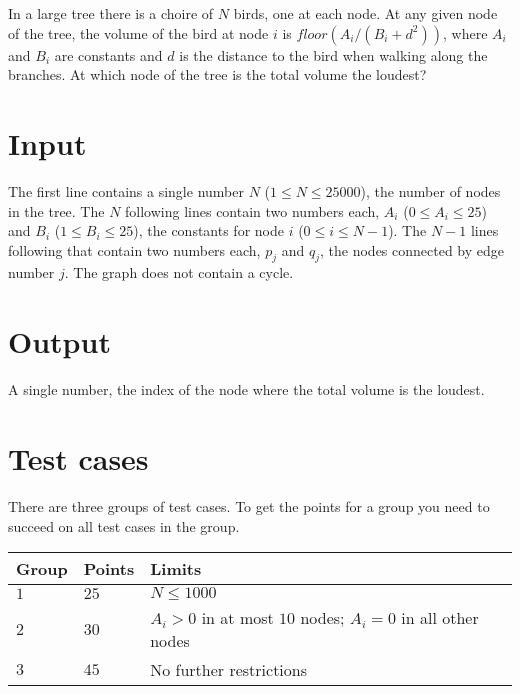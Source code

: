 In a large tree there is a choire of $N$ birds, one at each node. At any given node of the tree, the volume of the bird at node $i$ is $floor(A_i / (B_i + d^2))$, where $A_i$ and $B_i$ are constants and $d$ is the distance to the bird when walking along the branches. At which node of the tree is the total volume the loudest?

\section*{Input}
The first line contains a single number $N$ ($1 \le N \le 25000$), the number of nodes in the tree. The $N$ following lines contain two numbers each, $A_i$ ($0 \le A_i \le 25$) and $B_i$ ($1 \le B_i \le 25$), the constants for node $i$ ($0 \le i \le N-1$). The $N-1$ lines following that contain two numbers each, $p_j$ and $q_j$, the nodes connected by edge number $j$. The graph does not contain a cycle.

\section*{Output}
A single number, the index of the node where the total volume is the loudest.

\section*{Test cases}
There are three groups of test cases. To get the points for a group you need to succeed on all test cases in the group.

\noindent
\begin{tabular}{| l | l | l |}
  \hline
  Group & Points & Limits                                                      \\ \hline
  $1$   & $25$   & $N \le 1000$                                                \\ \hline
  $2$   & $30$   & $A_i > 0$ in at most $10$ nodes; $A_i=0$ in all other nodes \\ \hline
  $3$   & $45$   & No further restrictions                                     \\ \hline
\end{tabular}
